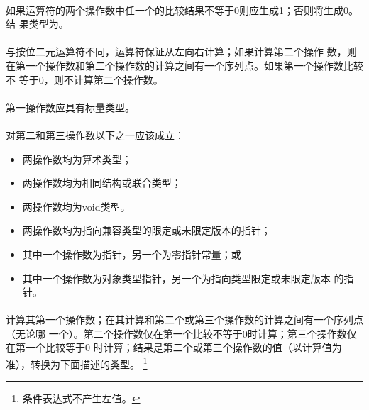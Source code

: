 {\semantic
\paragraph{}
如果\tm{||}运算符的两个操作数中任一个的比较结果不等于0则应生成1；否则将生成0。结
果类型为。

\paragraph{}
与按位二元\tm{|}运算符不同，\tm{||}运算符保证从左向右计算；如果计算第二个操作
数，则在第一个操作数和第二个操作数的计算之间有一个序列点。如果第一个操作数比较不
等于0，则不计算第二个操作数。

\syntax
\paragraph{}

\constraint
\paragraph{}
第一操作数应具有标量类型。

\paragraph{}
对第二和第三操作数以下之一应该成立：
\begin{itemize}
  \item{两操作数均为算术类型；}
  \item{两操作数均为相同结构或联合类型；}
  \item{两操作数均为void类型。}
  \item{两操作数均为指向兼容类型的限定或未限定版本的指针；}
  \item{其中一个操作数为指针，另一个为零指针常量；或}
  \item{其中一个操作数为对象类型指针，另一个为指向类型限定或未限定版本
    的指针。}
\end{itemize}

\semantic
\paragraph{}
计算其第一个操作数；在其计算和第二个或第三个操作数的计算之间有一个序列点（无论哪
一个）。第二个操作数仅在第一个比较不等于0时计算；第三个操作数仅在第一个比较等于0
时计算；结果是第二个或第三个操作数的值（以计算值为准），转换为下面描述的类型。
\footnote{条件表达式不产生左值。}

}
